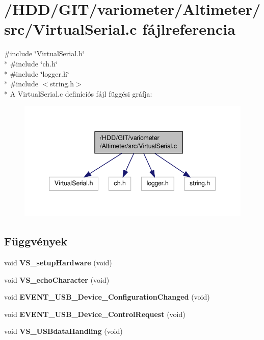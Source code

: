 \section{/\-H\-D\-D/\-G\-I\-T/variometer/\-Altimeter/src/\-Virtual\-Serial.c fájlreferencia}
\label{_virtual_serial_8c}
{\ttfamily \#include \char`\"{}Virtual\-Serial.\-h\char`\"{}}\\*
{\ttfamily \#include \char`\"{}ch.\-h\char`\"{}}\\*
{\ttfamily \#include \char`\"{}logger.\-h\char`\"{}}\\*
{\ttfamily \#include $<$string.\-h$>$}\\*
A Virtual\-Serial.\-c definíciós fájl függési gráfja\-:
\nopagebreak
\begin{figure}[H]
\begin{center}
\leavevmode
\includegraphics[width=342pt]{_virtual_serial_8c__incl}
\end{center}
\end{figure}
\subsection*{Függvények}
\begin{DoxyCompactItemize}
\item 
void {\bf V\-S\-\_\-setup\-Hardware} (void)
\item 
void {\bf V\-S\-\_\-echo\-Character} (void)
\item 
void {\bf E\-V\-E\-N\-T\-\_\-\-U\-S\-B\-\_\-\-Device\-\_\-\-Configuration\-Changed} (void)
\item 
void {\bf E\-V\-E\-N\-T\-\_\-\-U\-S\-B\-\_\-\-Device\-\_\-\-Control\-Request} (void)
\item 
void {\bf V\-S\-\_\-\-U\-S\-Bdata\-Handling} (void)
\end{DoxyCompactItemize}

